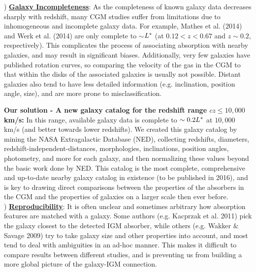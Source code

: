 \documentclass[12pt]{article}
\begin{document}
) \textbf{\underline{Galaxy Incompleteness}}: As the completeness of known galaxy data decreases sharply with redshift, many CGM studies suffer from limitations due to inhomogeneous and incomplete galaxy data. For example, Mathes et al. (2014) and Werk et al. (2014) are only complete to $\sim$$L^{\**}$ (at $0.12<z<0.67$ and $z\sim$$0.2$, respectively). This complicates the process of associating absorption with nearby galaxies, and may result in significant biases. Additionally, very few galaxies have published rotation curves, so comparing the velocity of the gas in the CGM to that within the disks of the associated galaxies is usually not possible. Distant galaxies also tend to have less detailed information (e.g. inclination, position angle, size), and are more prone to misclassification.

\textbf{Our solution - A new galaxy catalog for the redshift range $cz \leq 10,000$ km/s:} In this range, available galaxy data is complete to $\sim0.2 L^{\**}$ at $10,000$ km/s (and better towards lower redshifts). We created this galaxy catalog by mining the NASA Extragalactic Database (NED), collecting redshifts, diameters, redshift-independent-distances, morphologies, inclinations, position angles, photometry, and more for each galaxy, and then normalizing these values beyond the basic work done by NED. This catalog is the most complete, comprehensive and up-to-date nearby galaxy catalog in existence (to be published in 2016), and is key to drawing direct comparisons between the properties of the absorbers in the CGM and the properties of galaxies on a larger scale then ever before.\\


) \textbf{\underline{Reproducibility}}: It is often unclear and sometimes arbitrary how absorption features are matched with a galaxy. Some authors (e.g. Kacprzak et al. 2011) pick the galaxy closest to the detected IGM absorber, while others (e.g. Wakker $\&$ Savage 2009) try to take galaxy size and other properties into account, and most tend to deal with ambiguities in an ad-hoc manner. This makes it difficult to compare results between different studies, and is preventing us from building a more global picture of the galaxy-IGM connection.
\end{document}
